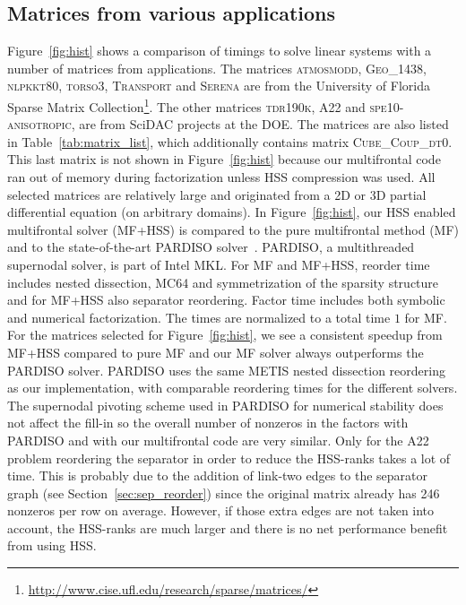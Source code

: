 \documentclass{article}
\newcommand{\tm}{\textsuperscript{\textregistered}}
\begin{document}
\subsection{Matrices from various applications}
Figure~\ref{fig:hist} shows a comparison of timings to solve linear
systems with a number of matrices from applications. The matrices
\textsc{atmosmodd}, \textsc{Geo\_1438}, \textsc{nlpkkt80},
\textsc{torso3}, \textsc{Transport} and \textsc{Serena} are from the
University of Florida Sparse Matrix
Collection\footnote{\url{http://www.cise.ufl.edu/research/sparse/matrices/}}. The
other matrices \textsc{tdr190k}, \textsc{A22} and
\textsc{spe10-anisotropic}, are from SciDAC projects at the DOE. The
matrices are also listed in Table~\ref{tab:matrix_list}, which
additionally contains matrix \textsc{Cube\_Coup\_dt0}. This last
matrix is not shown in Figure~\ref{fig:hist} because our multifrontal
code ran out of memory during factorization unless HSS compression was
used. All selected matrices are relatively large and originated from a
2D or 3D partial differential equation (on arbitrary domains). In
Figure~\ref{fig:hist}, our HSS enabled multifrontal solver (MF+HSS) is
compared to the pure multifrontal method (MF) and to the
state-of-the-art PARDISO solver~\cite{schenk2000efficient}. PARDISO, a
multithreaded supernodal solver, is part of Intel\tm{} MKL. For MF and
MF+HSS, reorder time includes nested dissection, MC64 and
symmetrization of the sparsity structure and for MF+HSS also separator
reordering. Factor time includes both symbolic and numerical
factorization. The times are normalized to a total time $1$ for
MF. For the matrices selected for Figure~\ref{fig:hist}, we see a
consistent speedup from MF+HSS compared to pure MF and our MF solver
always outperforms the PARDISO solver. PARDISO uses the same METIS
nested dissection reordering as our implementation, with comparable
reordering times for the different solvers. The supernodal pivoting
scheme used in PARDISO for numerical stability does not affect the
fill-in so the overall number of nonzeros in the factors with PARDISO
and with our multifrontal code are very similar. Only for the
\textsc{A22} problem reordering the separator in order to reduce the
HSS-ranks takes a lot of time. This is probably due to the addition of
link-two edges to the separator graph (see
Section~\ref{sec:sep_reorder}) since the original matrix already has
246 nonzeros per row on average. However, if those extra edges are not
taken into account, the HSS-ranks are much larger and there is no net
performance benefit from using HSS.
\end{document}
